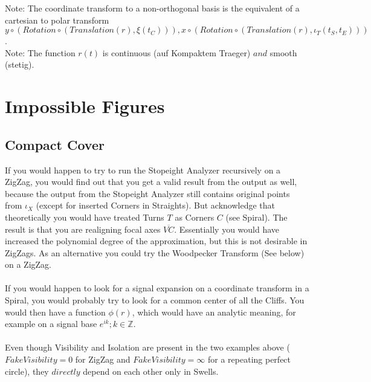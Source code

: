 \documentclass{report}
\begin{document}
Note: The coordinate transform to a non-orthogonal basis is the equivalent of a cartesian to polar transform $y\circ (Rotation\circ (Translation(r),\xi(t_{C}))),x\circ (Rotation\circ (Translation(r),\iota_{T}(t_{S},t_{E})))$.\\
Note: The function $r(t)$ is continuous (auf Kompaktem Traeger) $and$ smooth (stetig).

\section{Impossible Figures}

\subsection*{Compact Cover}
If you would happen to try to run the Stopeight Analyzer recursively on a ZigZag, you would find out that you get a valid result from the output as well, because the output from the Stopeight Analyzer still contains original points from $\iota_{X}$ (except for inserted Corners in Straights). But acknowledge that theoretically you would have treated Turns $T$ as Corners $C$ (see Spiral). The result is that you are realigning focal axes $\overline{VC}$. Essentially you would have increased the polynomial degree of the approximation, but this is not desirable in ZigZags. As an alternative you could try the Woodpecker Transform (See below) on a ZigZag.\\\\
If you would happen to look for a signal expansion on a coordinate transform in a Spiral, you would probably try to look for a common center of all the Cliffs. You would then have a function $\phi (r)$, which would have an analytic meaning, for example on a signal base $e^{ik};k \in \mathbb{Z}$.\\\\
Even though Visibility and Isolation are present in the two examples above ($Fake Visibility=0$ for ZigZag and $Fake Visibility=\infty$ for a repeating perfect circle), they $directly$ depend on each other only in Swells.
\end{document}
